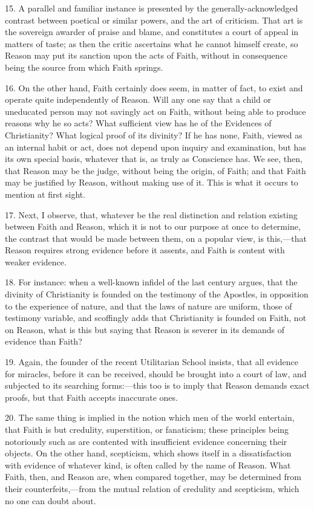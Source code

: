 15. A parallel and familiar instance is presented by the
generally-acknowledged contrast between poetical or similar powers,
and the art of criticism. That art is the sovereign awarder of praise
and blame, and constitutes a court of appeal in matters of taste; as
then the critic ascertains what he cannot himself create, so Reason
may put its sanction upon the acts of Faith, without in consequence
being the source from which Faith springs.

16. On the other hand, Faith certainly does seem, in matter of
fact, to exist and operate quite independently of Reason. Will any one
say that a child or uneducated person may not savingly act on Faith,
without being able to produce reasons why he so acts? What sufficient
view has he of the Evidences of Christianity? What logical proof of
its divinity? If he has none, Faith, viewed as an internal habit or
act, does not depend upon inquiry and examination, but has its own
special basis, whatever that is, as truly as Conscience has. We see,
then, that Reason may be the judge, without being the origin, of
Faith; and that Faith may be justified by Reason, without making use
of it. This is what it occurs to mention at first sight.

17. Next, I observe, that, whatever be the real distinction and
relation existing between Faith and Reason, which it is not to our
purpose at once to determine, the contrast that would be made between
them, on a popular view, is this,—that Reason requires strong
evidence before it assents, and Faith is content with weaker evidence.

18. For instance: when a well-known infidel of the last century
argues, that the divinity of Christianity is founded on the testimony
of the Apostles, in opposition to the experience of nature, and that
the laws of nature are uniform, those of testimony variable, and
scoffingly adds that Christianity is founded on Faith, not on Reason,
what is this but saying that Reason is severer in its demands of
evidence than Faith?

19. Again, the founder of the recent Utilitarian School insists,
that all evidence for miracles, before it can be received, should be
brought into a court of law, and subjected to its searching forms:—this
too is to imply that Reason demands exact proofs, but that Faith
accepts inaccurate ones.

20. The same thing is implied in the notion which men of the world
entertain, that Faith is but credulity, superstition, or fanaticism;
these principles being notoriously such as are contented with
insufficient evidence concerning their objects. On the other hand,
scepticism, which shows itself in a dissatisfaction with evidence of
whatever kind, is often called by the name of Reason. What Faith,
then, and Reason are, when compared together, may be determined from
their counterfeits,—from the mutual relation of credulity and
scepticism, which no one can doubt about.

